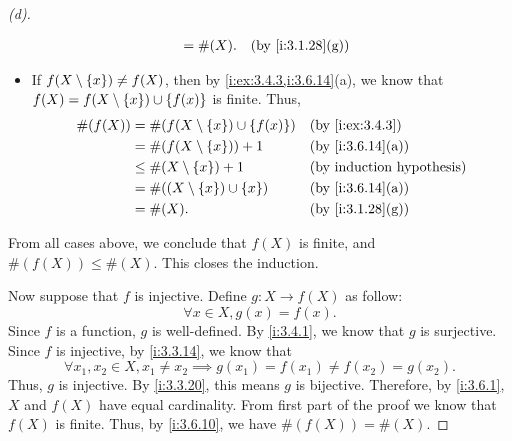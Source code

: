 \begin{proof}[(d)]
\begin{itemize}
\begin{align*}
                     & = \#(X).                                 &  & \by{i:3.1.28}[g]
          \end{align*}
    \item If \(f(X \setminus \left\lbrace x\right\rbrace) \neq f(X)\), then by \cref{i:ex:3.4.3,i:3.6.14}(a), we know that \(f(X) = f(X \setminus \left\lbrace x\right\rbrace) \cup \left\lbrace f(x)\right\rbrace\) is finite.
          Thus,
          \begin{align*}
            \#(f(X)) & = \#(f(X \setminus \set{x}) \cup \set{f(x)}) &  & \by{i:ex:3.4.3}  \\
                     & = \#(f(X \setminus \set{x})) + 1             &  & \by{i:3.6.14}[a] \\
                     & \leq \#(X \setminus \set{x}) + 1             &  & \byIH            \\
                     & = \#((X \setminus \set{x}) \cup \set{x})     &  & \by{i:3.6.14}[a] \\
                     & = \#(X).                                     &  & \by{i:3.1.28}[g]
          \end{align*}
  \end{itemize}
  From all cases above, we conclude that \(f(X)\) is finite, and \(\#(f(X)) \leq \#(X)\).
  This closes the induction.

  Now suppose that \(f\) is injective.
  Define \(g : X \to f(X)\) as follow:
  \[
    \forall x \in X, g(x) = f(x).
  \]
  Since \(f\) is a function, \(g\) is well-defined.
  By \cref{i:3.4.1}, we know that \(g\) is surjective.
  Since \(f\) is injective, by \cref{i:3.3.14}, we know that
  \[
    \forall x_1, x_2 \in X, x_1 \neq x_2 \implies g(x_1) = f(x_1) \neq f(x_2) = g(x_2).
  \]
  Thus, \(g\) is injective.
  By \cref{i:3.3.20}, this means \(g\) is bijective.
  Therefore, by \cref{i:3.6.1}, \(X\) and \(f(X)\) have equal cardinality.
  From first part of the proof we know that \(f(X)\) is finite.
  Thus, by \cref{i:3.6.10}, we have \(\#(f(X)) = \#(X)\).
\end{proof}

